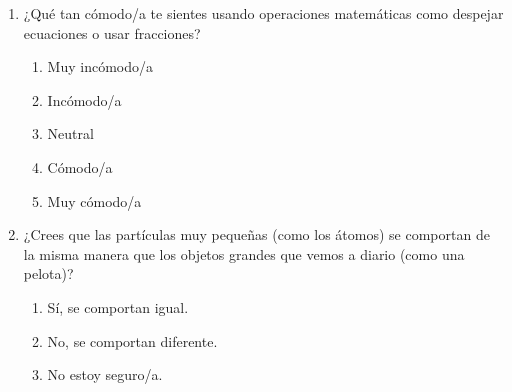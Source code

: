 \documentclass[10pt,a4paper]{article}
\begin{document}
\begin{enumerate}
    \item ¿Qué tan cómodo/a te sientes usando operaciones matemáticas como despejar ecuaciones o usar fracciones?
    \begin{enumerate}[label=\alph*)]
        \item Muy incómodo/a
        \item Incómodo/a
        \item Neutral
        \item Cómodo/a
        \item Muy cómodo/a
    \end{enumerate}

    \item ¿Crees que las partículas muy pequeñas (como los átomos) se comportan de la misma manera que los objetos grandes que vemos a diario (como una pelota)?
    \begin{enumerate}[label=\alph*)]
        \item Sí, se comportan igual.
        \item No, se comportan diferente.
        \item No estoy seguro/a.
    \end{enumerate}
\end{enumerate}
\end{document}
